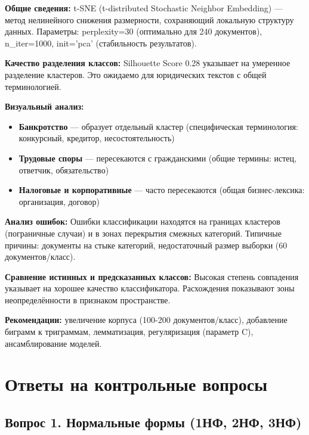 \documentclass[a4paper,12pt]{article}
\begin{document}
\begin{infobox}
\textbf{Общие сведения:} t-SNE (t-distributed Stochastic Neighbor Embedding) — метод нелинейного снижения размерности, сохраняющий локальную структуру данных. Параметры: perplexity=30 (оптимально для 240 документов), n\_iter=1000, init='pca' (стабильность результатов).

\textbf{Качество разделения классов:} Silhouette Score 0.28 указывает на умеренное разделение кластеров. Это ожидаемо для юридических текстов с общей терминологией.

\textbf{Визуальный анализ:}
\begin{itemize}
  \item \textbf{Банкротство} — образует отдельный кластер (специфическая терминология: конкурсный, кредитор, несостоятельность)
  \item \textbf{Трудовые споры} — пересекаются с гражданскими (общие термины: истец, ответчик, обязательство)
  \item \textbf{Налоговые и корпоративные} — часто пересекаются (общая бизнес-лексика: организация, договор)
\end{itemize}

\textbf{Анализ ошибок:} Ошибки классификации находятся на границах кластеров (пограничные случаи) и в зонах перекрытия смежных категорий. Типичные причины: документы на стыке категорий, недостаточный размер выборки (60 документов/класс).

\textbf{Сравнение истинных и предсказанных классов:} Высокая степень совпадения указывает на хорошее качество классификатора. Расхождения показывают зоны неопределённости в признаком пространстве.

\textbf{Рекомендации:} увеличение корпуса (100-200 документов/класс), добавление биграмм к триграммам, лемматизация, регуляризация (параметр C), ансамблирование моделей.
\end{infobox}


\section{Ответы на контрольные вопросы}

\subsection*{Вопрос 1. Нормальные формы (1НФ, 2НФ, 3НФ)}
\end{document}
